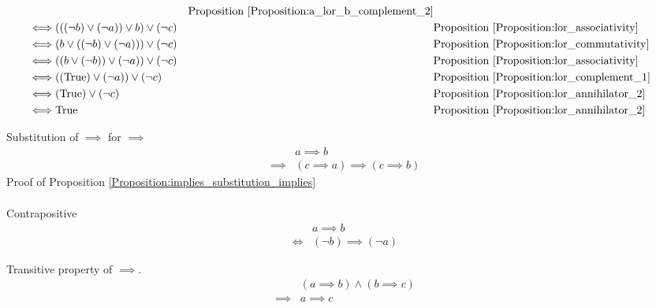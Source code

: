 \begin{prop}
\begin{align*}
& & \text{Proposition \ref{Proposition:a_lor_b_complement_2}} \\
\iff & (((\lnot b) \lor (\lnot a)) \lor b) \lor (\lnot c)
& & \text{Proposition \ref{Proposition:lor_associativity}} \\
\iff & (b \lor ((\lnot b) \lor (\lnot a))) \lor (\lnot c)
& & \text{Proposition \ref{Proposition:lor_commutativity}} \\
\iff & ((b \lor (\lnot b)) \lor (\lnot a)) \lor (\lnot c)
& & \text{Proposition \ref{Proposition:lor_associativity}} \\
\iff & ((\text{True}) \lor (\lnot a)) \lor (\lnot c)
& & \text{Proposition \ref{Proposition:lor_complement_1}} \\
\iff & (\text{True}) \lor (\lnot c)
& & \text{Proposition \ref{Proposition:lor_annihilator_2}} \\
\iff & \text{True}
& & \text{Proposition \ref{Proposition:lor_annihilator_2}} \\
\end{align*}
\end{prop}

\begin{prop}
\label{Proposition:implies_substitution_implies}
Substitution of $\implies$ for $\implies$
\begin{align*}
& a \implies b \\
\implies & (c \implies a) \implies (c \implies b)
\end{align*}
Proof of Proposition \ref{Proposition:implies_substitution_implies}
\begin{align*}
\end{align*}
\end{prop}

\begin{prop}
\label{Proposition:contrapositive}
Contrapositive
\begin{align*}
& a \implies b \\
\iff & (\lnot b) \implies (\lnot a)
\end{align*}
\end{prop}

\begin{prop}
\label{Proposition:implies_transitive}
Transitive property of $\implies$.
\begin{align*}
& (a \implies b) \land (b \implies c) \\
\implies & a \implies c
\end{align*}
\end{prop}

